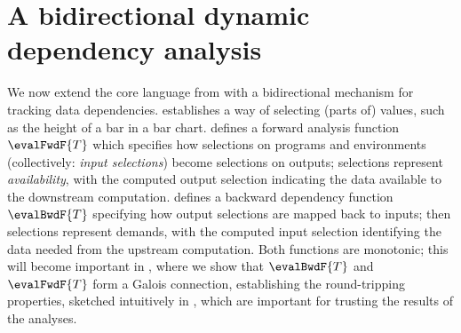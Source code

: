 \section{A bidirectional dynamic dependency analysis}
\label{sec:data-dependencies}

We now extend the core language from  with a bidirectional mechanism for tracking data dependencies.  establishes a way of selecting (parts of) values, such as the height of a bar in a bar chart.  defines a forward analysis function $\evalFwdF{T}$ which specifies how selections on programs and environments (collectively: \emph{input selections}) become selections on outputs; selections represent \emph{availability}, with the computed output selection indicating the data available to the downstream computation.  defines a backward dependency function $\evalBwdF{T}$ specifying how output selections are mapped back to inputs; then selections represent demands, with the computed input selection identifying the data needed from the upstream computation. Both functions are monotonic; this will become important in , where we show that $\evalBwdF{T}$ and $\evalFwdF{T}$ form a Galois connection, establishing the round-tripping properties, sketched intuitively in , which are important for trusting the results of the analyses.



